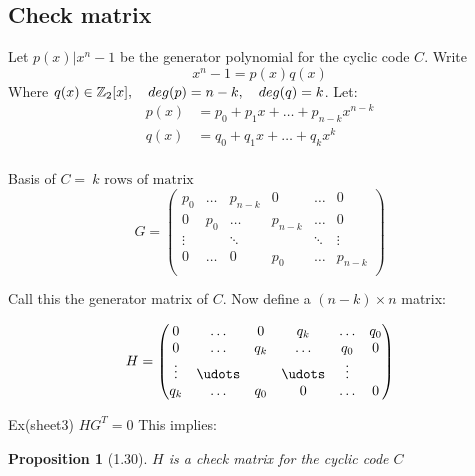\documentclass[]{article}
\newtheorem{prop}[thm]{Proposition}
\theoremstyle{definition}
\theoremstyle{remark}
\numberwithin{equation}{section}
\begin{document}
		\subsection{Check matrix}
			Let $p(x) | x^n - 1$ be the generator polynomial for the cyclic code $C$. Write
			\[
				x^n-1 = p(x)q(x)
			\]
			Where $q(x) \in \mathbb{Z}_2[x],\quad deg(p)=n-k,\quad deg(q)=k$. Let:\\
			\begin{align*}
				p(x) &= p_0 + p_1x + \hdots + p_{n-k} x ^{n-k}\\
				q(x) &= q_0 + q_1x + \hdots + q_k x ^k\\
			\end{align*}

			Basis of $C =\ \text{$k$ rows of matrix}$\\

			\[
				G = \begin{pmatrix}
					p_0 & \hdots &p_{n-k} & 0 & \hdots & 0\\
					0 	& p_0 & \hdots &p_{n-k} & \hdots &0\\
					\vdots& &\ddots & &\ddots &\vdots\\
					0 & \hdots & 0 & p_0 & \hdots &p_{n-k}\\
					\end{pmatrix}
			\]

			Call this the generator matrix of $C$. Now define a $(n-k) \times n$ matrix:


			\[
				H = \begin{pmatrix}
					0 & \hdots & 0 &q_k & \hdots & q_0\\
					0 & \hdots &q_k & \hdots & q_0& 0\\
					 	   \vdots & \udots &  & \udots & \vdots\\
					q_k & \hdots & q_0 & 0 & \hdots & 0 \\
					\end{pmatrix}
			\]

			Ex(sheet3) $HG^T = 0$ This implies:\\
			\begin{prop}[1.30]
				$H$ is a check matrix for the cyclic code $C$
			\end{prop}
\end{document}
